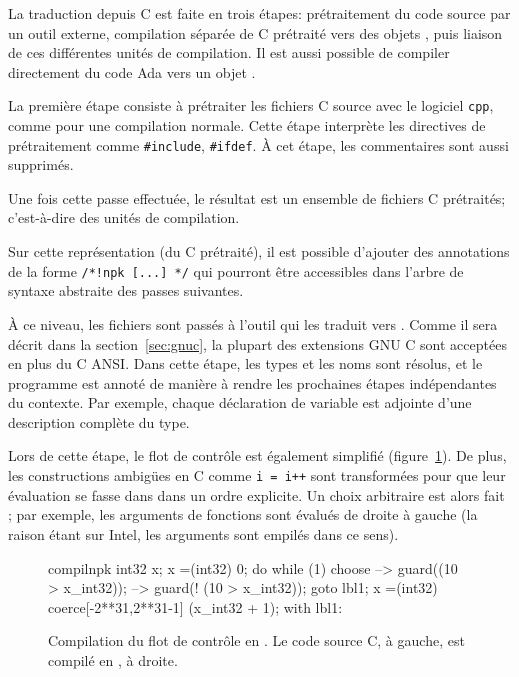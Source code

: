 La traduction depuis C est faite en trois étapes: prétraitement du code source
par un outil externe, compilation séparée de C prétraité vers des objets
\newspeak{}, puis liaison de ces différentes unités de compilation. Il est aussi
possible de compiler directement du code Ada vers un objet \newspeak{}.

La première étape consiste à prétraiter les fichiers C source avec le logiciel
\texttt{cpp}, comme pour une compilation normale. Cette étape interprète les
directives de prétraitement comme \texttt{\#include}, \texttt{\#ifdef}. À cet
étape, les commentaires sont aussi supprimés.

Une fois cette passe effectuée, le résultat est un ensemble de fichiers C
prétraités; c'est-à-dire des unités de compilation.

Sur cette représentation (du C prétraité), il est possible d'ajouter des
annotations de la forme \texttt{/*!npk [...] */} qui pourront être accessibles
dans l'arbre de syntaxe abstraite des passes suivantes.

À ce niveau, les fichiers sont passés à l'outil \ctonewspeak qui les
traduit vers \newspeak. Comme il sera décrit dans la section~\ref{sec:gnuc}, la
plupart des extensions GNU C sont acceptées en plus du C ANSI. Dans cette étape,
les types et les noms sont résolus, et le programme est annoté de manière à
rendre les prochaines étapes indépendantes du contexte. Par exemple, chaque
déclaration de variable est adjointe d'une description complète du type.

Lors de cette étape, le flot de contrôle est également simplifié
(figure~\ref{fig:flot-controle-simple}). De plus, les constructions ambigües en
C comme \texttt{i = i++} sont transformées pour que leur évaluation se fasse
dans dans un ordre explicite. Un choix arbitraire est alors fait ; par exemple,
les arguments de fonctions sont évalués de droite à gauche (la raison étant sur
Intel, les arguments sont empilés dans ce sens).

\begin{figure}[b]

\begin{SaveVerbatim}{compilnpk}
int32 x;
x =(int32) 0;
do {
    while (1) {
        choose {
            -->
                guard((10 > x_int32));
            -->
                guard(! (10 > x_int32));
                goto lbl1;
        }
        x =(int32) coerce[-2**31,2**31-1] (x_int32 + 1);
    }
} with lbl1: {
}
\end{SaveVerbatim}

\vrule\hspace{2pt}

    \caption[Compilation du flot de contrôle en \newspeak]
        {Compilation du flot de contrôle en \newspeak. Le code source C, à
            gauche,
        est compilé en \newspeak, à droite.}
    \label{fig:flot-controle-simple}
\end{figure}

